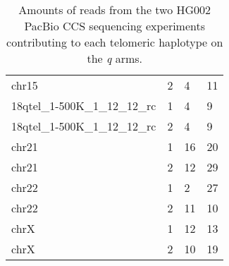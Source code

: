 \begin{samepage}
\begin{table}[h!]
\begin{tabular}{llll}
chr15                          &  2                   &  4                           &  11                          \\
18qtel\_1-500K\_1\_12\_12\_rc  &  1                   &  4                           &  9                           \\
18qtel\_1-500K\_1\_12\_12\_rc  &  2                   &  4                           &  9                           \\
chr21                          &  1                   &  16                          &  20                          \\
chr21                          &  2                   &  12                          &  29                          \\
chr22                          &  1                   &  2                           &  27                          \\
chr22                          &  2                   &  11                          &  10                          \\
chrX                           &  1                   &  12                          &  13                          \\
chrX                           &  2                   &  10                          &  19                          \\
\hline
\end{tabular}
\caption{Amounts of reads from the two HG002 PacBio CCS sequencing experiments contributing to each telomeric haplotype on the \textit{q} arms.}
\label{tab:hg002_haplotype_assignment}
\end{table}
\end{samepage}
